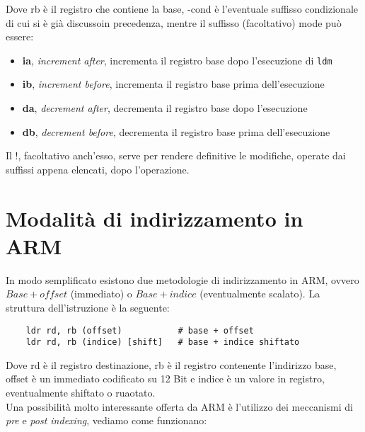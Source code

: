 \documentclass[class=book, crop=false]{standalone}
\begin{document}
Dove rb è il registro che contiene la base, -cond è l'eventuale suffisso condizionale di cui si è già discussoin precedenza, mentre il suffisso (facoltativo) mode può essere:

\begin{itemize}[nolistsep]
	\item \textbf{ia}, \emph{increment after}, incrementa il registro base dopo l'esecuzione di \texttt{ldm}
	\item \textbf{ib}, \emph{increment before}, incrementa il registro base prima dell'esecuzione
	\item \textbf{da}, \emph{decrement after}, decrementa il registro base dopo l'esecuzione
	\item \textbf{db}, \emph{decrement before}, decrementa il registro base prima dell'esecuzione
\end{itemize}

Il !, facoltativo anch'esso, serve per rendere definitive le modifiche, operate dai suffissi appena elencati, dopo l'operazione.

\section{Modalità di indirizzamento in ARM}
In modo semplificato esistono due metodologie di indirizzamento in ARM, ovvero $Base + offset$ (immediato) o $Base + indice$ (eventualmente scalato). La struttura dell'istruzione è la seguente:

\begin{verbatim}
	ldr rd, rb (offset)           # base + offset
	ldr rd, rb (indice) [shift]   # base + indice shiftato
\end{verbatim}

Dove rd è il registro destinazione, rb è il registro contenente l'indirizzo base, offset è un immediato codificato su 12 Bit e indice è un valore in registro, eventualmente shiftato o ruaotato.\\
Una possibilità molto interessante offerta da ARM è l'utilizzo dei meccanismi di \emph{pre} e \emph{post indexing}, vediamo come funzionano:
\end{document}
